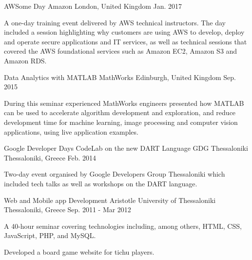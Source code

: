 

\begin{cventries}

  \cventry
    {AWSome Day} %
    {Amazon} %
    {London, United Kingdom} %
    {Jan. 2017} %
    {
      \begin{cvitems} %
        \item {A one-day training event delivered by AWS technical instructors. The day included a session highlighting why customers are using AWS to develop, deploy and operate secure applications and IT services, as well as technical sessions that covered the AWS foundational services such as Amazon EC2, Amazon S3 and Amazon RDS.}
      \end{cvitems}
    }
    
  \cventry
    {Data Analytics with MATLAB} %
    {MathWorks} %
    {Edinburgh, United Kingdom} %
    {Sep. 2015} %
    {
      \begin{cvitems} %
        \item {During this seminar experienced MathWorks engineers presented how MATLAB can be used to accelerate algorithm development and exploration, and reduce development time for machine learning, image processing and computer vision applications, using live application examples.}
      \end{cvitems}
    }
    
  \cventry
    {Google Developer Days CodeLab on the new DART Language} %
    {GDG Thessaloniki} %
    {Thessaloniki, Greece} %
    {Feb. 2014} %
    {
      \begin{cvitems} %
        \item {Two-day event organised by Google Developers Group Thessaloniki which included tech talks as well as workshops on the DART language.}
      \end{cvitems}
    }
    
  \cventry
    {Web and Mobile app Development} %
    {Aristotle University of Thessaloniki} %
    {Thessaloniki, Greece} %
    {Sep. 2011 - Mar 2012} %
    {
      \begin{cvitems} %
        \item {A 40-hour seminar covering technologies including, among others, HTML, CSS, JavaScript, PHP, and MySQL. }
        \item {Developed a board game website for tichu players.}
      \end{cvitems}
    }

\end{cventries}

